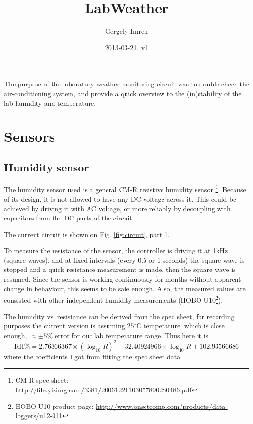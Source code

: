 \documentclass[12pt,a4paper]{article}
\author{Gergely Imreh}
\title{LabWeather}
\date{2013-03-21, v1}
\begin{document}
\maketitle

The purpose of the laboratory weather monitoring circuit was to double-check the air-conditioning system, and provide a quick overview to the (in)stability of the lab humidity and temperature.

\tableofcontents

\section{Sensors}

\subsection{Humidity sensor}

The humidity sensor used is a general CM-R resistive humidity sensor \footnote{CM-R spec sheet: \url{http://file.yizimg.com/3381/20061221103057890280486.pdf}}. Because of its design, it is not allowed to have any DC voltage across it. This could be achieved by driving it with AC voltage, or more reliably by decoupling with capacitors from the DC parts of the circuit

The current circuit is shown on Fig. \ref{fig:circuit}, part 1.

To measure the resistance of the sensor, the controller is driving it at 1kHz (square waves), and at fixed intervals (every 0.5 or 1 seconds) the square wave is stopped and a quick resistance measurement is made, then the square wave is resumed. Since the sensor is working continuously for months without apparent change in behaviour, this seems to be safe enough. Also, the measured values are consisted with other independent humidity measurements (HOBO U10\footnote{HOBO U10 product page: \url{http://www.onsetcomp.com/products/data-loggers/u12-011}}).

The humidity vs. resistance can be derived from the spec sheet, for recording purposes the current version is assuming $25\mathrm{^\circ C}$ temperature, which is close enough, $\approx \pm 5 \% $ error for our lab temperature range. Thus here it is
\begin{equation}
\mathrm{RH\%} =  2.76366367 \times (\log_{10} R) ^ 2 - 32.40924966 \times \log_{10}R + 102.93566686
\end{equation}
where the coefficients I got from fitting the spec sheet data.
\end{document}
